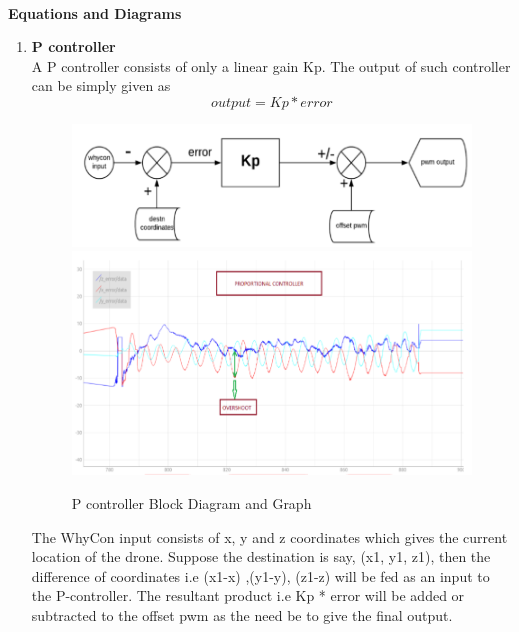 \\
\textbf{Equations and Diagrams}
\begin{enumerate}
    \item \textbf{P controller}\\
    A P controller consists of only a linear gain Kp. The output of such controller can be simply given as\\
    \begin{equation}
        output = Kp * error
    \end{equation}
    \begin{figure}[H]
        \centering
        \includegraphics[width=0.8\linewidth]{SummerInterReport/project/Images-Major/pblock.png}
        \includegraphics[width=0.8\linewidth]{SummerInterReport/project/Images-Major/pgraph.png}
        \caption{P controller Block Diagram and Graph}
        \label{fig:Pcontroller}
    \end{figure}
    The WhyCon input consists of x, y and z coordinates which gives the current location of the drone. Suppose the destination is say, (x1, y1, z1), then the difference of coordinates i.e (x1-x) ,(y1-y), (z1-z) will be fed as an input to the P-controller. The resultant product i.e Kp * error will be added or subtracted to the offset pwm as the need be to give the final output.
    

\end{enumerate}

